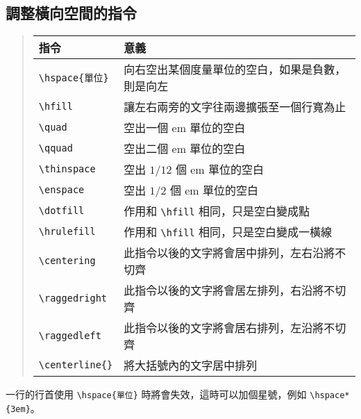 \subsection{調整橫向空間的指令}

\begin{quote}
   \begin{tabular}{ll}
      指令                    & 意義                                                    \\
      \hline
      \verb=\hspace{單位}= & 向右空出某個度量單位的空白，如果是負數，則是向左        \\
      \verb=\hfill= & 讓左右兩旁的文字往兩邊擴張至一個行寬為止                \\
      \verb=\quad= & 空出一個 em 單位的空白                                  \\
      \verb=\qquad= & 空出二個 em 單位的空白                                  \\
      \verb=\thinspace= & 空出 $1/12$ 個 em 單位的空白                            \\
      \verb=\enspace= & 空出 $1/2$ 個 em 單位的空白                             \\
      \verb=\dotfill= & 作用和 \verb|\hfill| 相同，只是空白變成點     \\
      \verb=\hrulefill= & 作用和 \verb|\hfill| 相同，只是空白變成一橫線 \\
      \verb=\centering= & 此指令以後的文字將會居中排列，左右沿將不切齊            \\
      \verb=\raggedright= & 此指令以後的文字將會居左排列，右沿將不切齊              \\
      \verb=\raggedleft= & 此指令以後的文字將會居右排列，左沿將不切齊              \\
      \verb=\centerline{}= & 將大括號內的文字居中排列
   \end{tabular}
\end{quote}
%
%
%
%
%

一行的行首使用 \verb|\hspace{單位}| 時將會失效，這時可以加個星號，例如 \verb|\hspace*{3em}|。

